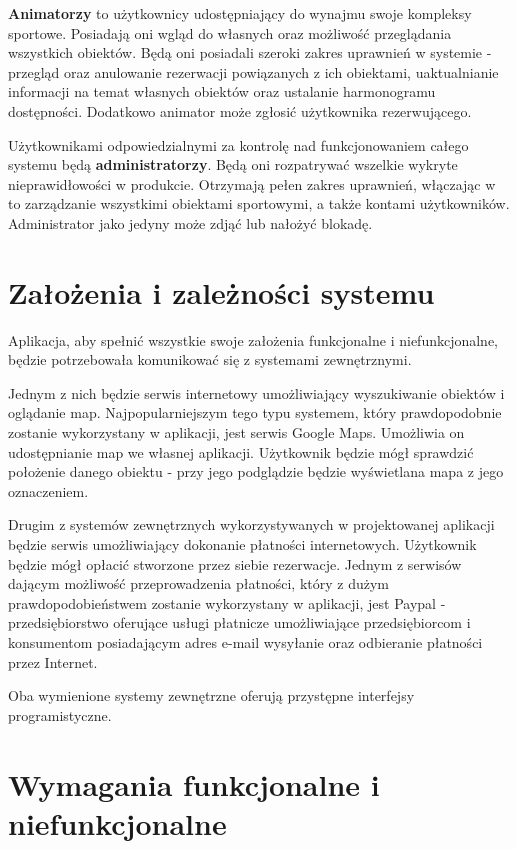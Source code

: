 \documentclass[a4paper,11pt]{article}
\begin{document}
\textbf{Animatorzy} to użytkownicy udostępniający do wynajmu swoje kompleksy sportowe. Posiadają oni wgląd do własnych oraz możliwość przeglądania wszystkich obiektów. Będą oni posiadali szeroki zakres uprawnień w systemie - przegląd oraz anulowanie rezerwacji powiązanych z ich obiektami, uaktualnianie informacji na temat własnych obiektów oraz ustalanie harmonogramu dostępności. Dodatkowo animator może zgłosić użytkownika rezerwującego. 

Użytkownikami odpowiedzialnymi za kontrolę nad funkcjonowaniem całego systemu będą \textbf{administratorzy}. Będą oni rozpatrywać wszelkie wykryte nieprawidłowości w produkcie. Otrzymają pełen zakres uprawnień, włączając w to zarządzanie wszystkimi obiektami sportowymi, a także kontami użytkowników. Administrator jako jedyny może zdjąć lub nałożyć blokadę.

\section{Założenia i zależności systemu}

Aplikacja, aby spełnić wszystkie swoje założenia funkcjonalne i niefunkcjonalne, będzie potrzebowała komunikować się z systemami zewnętrznymi. 

Jednym z nich będzie serwis internetowy umożliwiający wyszukiwanie obiektów i oglądanie map. Najpopularniejszym tego typu systemem, który prawdopodobnie zostanie wykorzystany w aplikacji, jest serwis Google Maps. Umożliwia on udostępnianie map we własnej aplikacji. Użytkownik będzie mógł sprawdzić położenie danego obiektu - przy jego podglądzie będzie wyświetlana mapa z jego oznaczeniem.

Drugim z systemów zewnętrznych wykorzystywanych w projektowanej aplikacji będzie serwis umożliwiający dokonanie płatności internetowych. Użytkownik będzie mógł opłacić stworzone przez siebie rezerwacje. Jednym z serwisów dającym możliwość przeprowadzenia płatności, który z dużym prawdopodobieństwem zostanie wykorzystany w aplikacji, jest Paypal - przedsiębiorstwo oferujące usługi płatnicze umożliwiające przedsiębiorcom i konsumentom posiadającym adres e-mail wysyłanie oraz odbieranie płatności przez Internet.

Oba wymienione systemy zewnętrzne oferują przystępne interfejsy programistyczne.

\section{Wymagania funkcjonalne i niefunkcjonalne}
\end{document}
